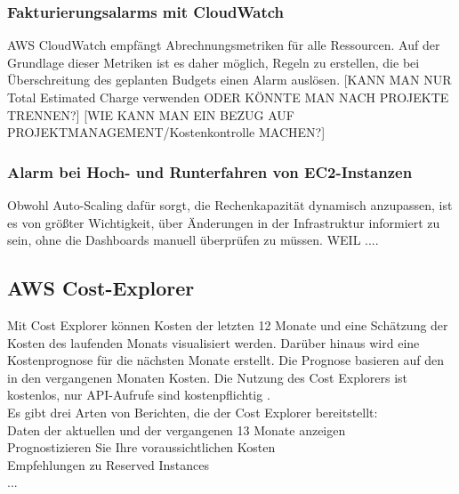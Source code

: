 



\subsubsection{Fakturierungsalarms mit CloudWatch}
AWS CloudWatch empfängt Abrechnungsmetriken für alle Ressourcen. Auf der Grundlage dieser Metriken ist es daher möglich, Regeln zu erstellen, die bei Überschreitung des geplanten Budgets einen Alarm auslösen.
[KANN MAN NUR Total Estimated Charge verwenden ODER KÖNNTE MAN NACH PROJEKTE TRENNEN?]
[WIE KANN MAN EIN BEZUG AUF PROJEKTMANAGEMENT/Kostenkontrolle MACHEN?]

\subsubsection{Alarm bei Hoch- und Runterfahren von EC2-Instanzen}
Obwohl Auto-Scaling dafür sorgt, die Rechenkapazität dynamisch anzupassen, ist es von größter Wichtigkeit, über Änderungen in der Infrastruktur informiert zu sein, ohne die Dashboards manuell überprüfen zu müssen.
WEIL ....

\subsection{AWS Cost-Explorer}
Mit Cost Explorer können Kosten der letzten 12 Monate und eine Schätzung der Kosten des laufenden Monats visualisiert werden. Darüber hinaus wird eine Kostenprognose für die nächsten Monate erstellt. Die Prognose basieren auf den in den vergangenen Monaten Kosten.
Die Nutzung des Cost Explorers ist kostenlos, nur API-Aufrufe sind kostenpflichtig .
\\
Es gibt drei Arten von Berichten, die der Cost Explorer bereitstellt:
\\
Daten der aktuellen und der vergangenen 13 Monate anzeigen
\\
Prognostizieren Sie Ihre voraussichtlichen Kosten
\\
Empfehlungen zu Reserved Instances 
\\
...


